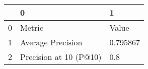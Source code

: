 \begin{tabular}{lll}
\toprule
{} &                       0 &         1 \\
\midrule
0 &                  Metric &     Value \\
1 &       Average Precision &  0.795867 \\
2 &  Precision at 10 (P@10) &       0.8 \\
\bottomrule
\end{tabular}
